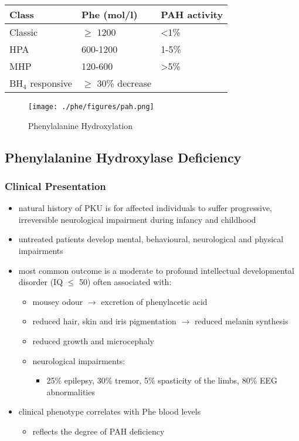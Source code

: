 \documentclass{scrartcl}
\begin{document}
\begin{table}[htbp]
\label{tab:orgb1159d4}
\centering
\begin{tabular}{lll}
Class & Phe (\textmu{}mol/l) & PAH activity\\
\hline
Classic & \(\ge\) 1200 & \textless{}1\%\\
HPA & 600-1200 & 1-5\%\\
MHP & 120-600 & \textgreater{}5\%\\
BH\(_{\text{4}}\) responsive & \(\ge\) 30\% decrease & \\
\end{tabular}
\end{table}

\begin{figure}[htbp]
\centering
\texttt{[image: ./phe/figures/pah.png]}
\caption{\label{fig:org0ee223b}
Phenylalanine Hydroxylation}
\end{figure}

\subsection{Phenylalanine Hydroxylase Deficiency}
\label{sec:org6fc4449}
\subsubsection{Clinical Presentation}
\label{sec:orgdeb3dc0}
\begin{itemize}
\item natural history of PKU is for affected individuals to suffer
progressive, irreversible neurological impairment during infancy and
childhood
\item untreated patients develop mental, behavioural, neurological and
physical impairments
\item most common outcome is a moderate to profound intellectual
developmental disorder (IQ \(\le\) 50) often associated with:
\begin{itemize}
\item mousey odour \(\to\) excretion of phenylacetic acid
\item reduced hair, skin and iris pigmentation \(\to\) reduced melanin synthesis
\item reduced growth and microcephaly
\item neurological impairments:
\begin{itemize}
\item 25\% epilepsy, 30\% tremor, 5\% spasticity of the limbs, 80\% EEG abnormalities
\end{itemize}
\end{itemize}
\item clinical phenotype correlates with Phe blood levels
\begin{itemize}
\item reflects the degree of PAH deficiency
\end{itemize}
\end{itemize}
\end{document}
